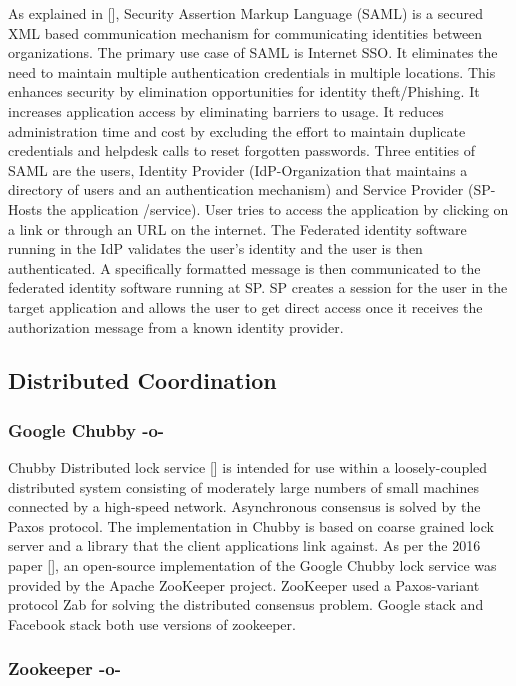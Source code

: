 As explained in [\cite{www-SAML}], Security Assertion Markup Language
(SAML) is a secured XML based communication mechanism for
communicating identities between organizations. The primary use case
of SAML is Internet SSO. It eliminates the need to maintain multiple
authentication credentials in multiple locations. This enhances
security by elimination opportunities for identity theft/Phishing. It
increases application access by eliminating barriers to usage. It
reduces administration time and cost by excluding the effort to
maintain duplicate credentials and helpdesk calls to reset forgotten
passwords. Three entities of SAML are the users, Identity Provider
(IdP-Organization that maintains a directory of users and an
authentication mechanism) and Service Provider (SP-Hosts the
application /service). User tries to access the application by
clicking on a link or through an URL on the internet. The Federated
identity software running in the IdP validates the user's identity and
the user is then authenticated. A specifically formatted message is
then communicated to the federated identity software running at SP. SP
creates a session for the user in the target application and allows
the user to get direct access once it receives the authorization
message from a known identity provider.

\subsection{Distributed Coordination}


\subsubsection{Google Chubby -o-}

Chubby Distributed lock service [\cite{www-chubby}] is intended for use
within a loosely-coupled distributed system consisting of moderately
large numbers of small machines connected by a high-speed
network. Asynchronous consensus is solved by the Paxos protocol. The
implementation in Chubby is based on coarse grained lock server and a
library that the client applications link against.  As per the 2016
paper [\cite{chubby-paper-2016}], an open-source implementation of the
Google Chubby lock service was provided by the Apache ZooKeeper
project. ZooKeeper used a Paxos-variant protocol Zab for solving the
distributed consensus problem.  Google stack and Facebook stack both
use versions of zookeeper.
     
\subsubsection{Zookeeper -o-}
 
